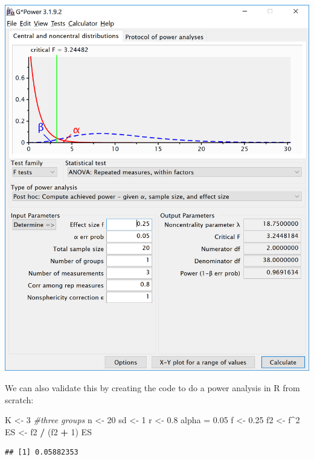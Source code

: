 \documentclass[
]{book}
\newenvironment{Shaded}{\begin{snugshade}}{\end{snugshade}}
\newcommand{\CommentTok}[1]{\textcolor[rgb]{0.56,0.35,0.01}{\textit{#1}}}
\newcommand{\DecValTok}[1]{\textcolor[rgb]{0.00,0.00,0.81}{#1}}
\newcommand{\FloatTok}[1]{\textcolor[rgb]{0.00,0.00,0.81}{#1}}
\newcommand{\NormalTok}[1]{#1}
\newcommand{\OperatorTok}[1]{\textcolor[rgb]{0.81,0.36,0.00}{\textbf{#1}}}
\newcommand{\StringTok}[1]{\textcolor[rgb]{0.31,0.60,0.02}{#1}}
\begin{document}
\includegraphics{screenshots/gpower_12.png}

\newpage

We can also validate this by creating the code to do a power analysis in R from scratch:

\begin{Shaded}
\begin{Highlighting}[]
\NormalTok{K <-}\StringTok{ }\DecValTok{3} \CommentTok{#three groups}
\NormalTok{n <-}\StringTok{ }\DecValTok{20}
\NormalTok{sd <-}\StringTok{ }\DecValTok{1}
\NormalTok{r <-}\StringTok{ }\FloatTok{0.8}
\NormalTok{alpha =}\StringTok{ }\FloatTok{0.05}
\NormalTok{f <-}\StringTok{ }\FloatTok{0.25}
\NormalTok{f2 <-}\StringTok{ }\NormalTok{f}\OperatorTok{^}\DecValTok{2}
\NormalTok{ES <-}\StringTok{ }\NormalTok{f2 }\OperatorTok{/}\StringTok{ }\NormalTok{(f2 }\OperatorTok{+}\StringTok{ }\DecValTok{1}\NormalTok{)}
\NormalTok{ES}
\end{Highlighting}
\end{Shaded}

\begin{verbatim}
## [1] 0.05882353
\end{verbatim}
\end{document}
